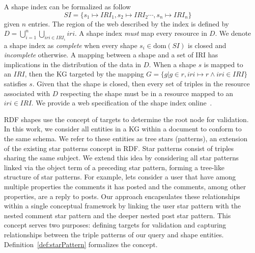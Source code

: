 A shape index can be formalized as follow
\begin{equation}\label{eq:shapeIndex}
   SI = \{s_1 \mapsto IRI_1, s_2 \mapsto IRI_2 \cdots, s_n \mapsto IRI_n\}
\end{equation}
given $n$ entries.
The region of the web described by the index is defined by $D = \bigcup_{i=1}^{n} \bigcup_{iri \in IRI_i} iri$.
A shape index \emph{must} map every resource in $D$.
We denote a shape index as \emph{complete} when every shape $s_i \in \text{dom}(SI)$ is closed and \emph{incomplete} otherwise.
A mapping between a shape and a set of IRI has implications in the distribution of the data in $D$.
When a shape $s$ is mapped to an $IRI$, then the KG targeted by the mapping $G = \{g | g \in r, iri \mapsto r \land iri \in IRI\}$ satisfies $s$.
Given that the shape is closed, then every set of triples in the resource associated with $D$ respecting the shape must be in a resource mapped to an $iri \in IRI$.
We provide a web specification of the shape index online~.

RDF shapes use the concept of targets to determine the root node for validation.
In this work, we consider all entities in a KG within a document to conform to the same schema.
We refer to these entities as tree stars (patterns), an extension of the existing star patterns concept in RDF.
Star patterns consist of triples sharing the same subject.
We extend this idea by considering all star patterns linked via the object term of a preceding star pattern, forming a tree-like structure of star patterns.
For example, lets consider a user that have among multiple properties the comments it has posted and the comments, among other properties, are a reply to posts.
Our approach encapsulates these relationships within a single conceptual framework by linking the user star pattern with the nested comment star pattern and the deeper nested post star pattern.
This concept serves two purposes: defining targets for validation and capturing relationships between the triple patterns of our query and shape entities.
Definition~\ref{def:starPattern} formalizes the concept.

